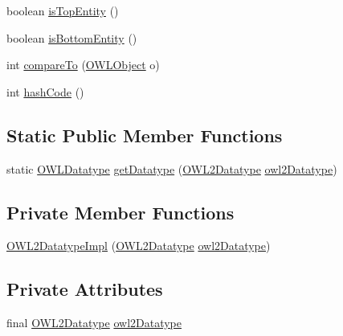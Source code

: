 \begin{DoxyCompactItemize}
boolean \hyperlink{classuk_1_1ac_1_1manchester_1_1cs_1_1owl_1_1owlapi_1_1_o_w_l2_datatype_impl_aa48577768b9bb794fd276e3d36056dcc}{is\-Top\-Entity} ()
\item 
boolean \hyperlink{classuk_1_1ac_1_1manchester_1_1cs_1_1owl_1_1owlapi_1_1_o_w_l2_datatype_impl_a5bce3ba47669ff3c2eb7a567dca98ea3}{is\-Bottom\-Entity} ()
\item 
int \hyperlink{classuk_1_1ac_1_1manchester_1_1cs_1_1owl_1_1owlapi_1_1_o_w_l2_datatype_impl_a5d29f7647b837f9bd0194e025109a2e8}{compare\-To} (\hyperlink{interfaceorg_1_1semanticweb_1_1owlapi_1_1model_1_1_o_w_l_object}{O\-W\-L\-Object} o)
\item 
int \hyperlink{classuk_1_1ac_1_1manchester_1_1cs_1_1owl_1_1owlapi_1_1_o_w_l2_datatype_impl_a0b2ef54e63654d5cf104c17926c466f0}{hash\-Code} ()
\end{DoxyCompactItemize}
\subsection*{Static Public Member Functions}
\begin{DoxyCompactItemize}
\item 
static \hyperlink{interfaceorg_1_1semanticweb_1_1owlapi_1_1model_1_1_o_w_l_datatype}{O\-W\-L\-Datatype} \hyperlink{classuk_1_1ac_1_1manchester_1_1cs_1_1owl_1_1owlapi_1_1_o_w_l2_datatype_impl_a3e20ec6dcdb8bbcb0d9c5fd61b12550d}{get\-Datatype} (\hyperlink{enumorg_1_1semanticweb_1_1owlapi_1_1vocab_1_1_o_w_l2_datatype}{O\-W\-L2\-Datatype} \hyperlink{classuk_1_1ac_1_1manchester_1_1cs_1_1owl_1_1owlapi_1_1_o_w_l2_datatype_impl_a874e5f38af5add32e6839e288a26f597}{owl2\-Datatype})
\end{DoxyCompactItemize}
\subsection*{Private Member Functions}
\begin{DoxyCompactItemize}
\item 
\hyperlink{classuk_1_1ac_1_1manchester_1_1cs_1_1owl_1_1owlapi_1_1_o_w_l2_datatype_impl_afa0019f9ece1745758187764cd30d941}{O\-W\-L2\-Datatype\-Impl} (\hyperlink{enumorg_1_1semanticweb_1_1owlapi_1_1vocab_1_1_o_w_l2_datatype}{O\-W\-L2\-Datatype} \hyperlink{classuk_1_1ac_1_1manchester_1_1cs_1_1owl_1_1owlapi_1_1_o_w_l2_datatype_impl_a874e5f38af5add32e6839e288a26f597}{owl2\-Datatype})
\end{DoxyCompactItemize}
\subsection*{Private Attributes}
\begin{DoxyCompactItemize}
\item 
final \hyperlink{enumorg_1_1semanticweb_1_1owlapi_1_1vocab_1_1_o_w_l2_datatype}{O\-W\-L2\-Datatype} \hyperlink{classuk_1_1ac_1_1manchester_1_1cs_1_1owl_1_1owlapi_1_1_o_w_l2_datatype_impl_a874e5f38af5add32e6839e288a26f597}{owl2\-Datatype}
\end{DoxyCompactItemize}

